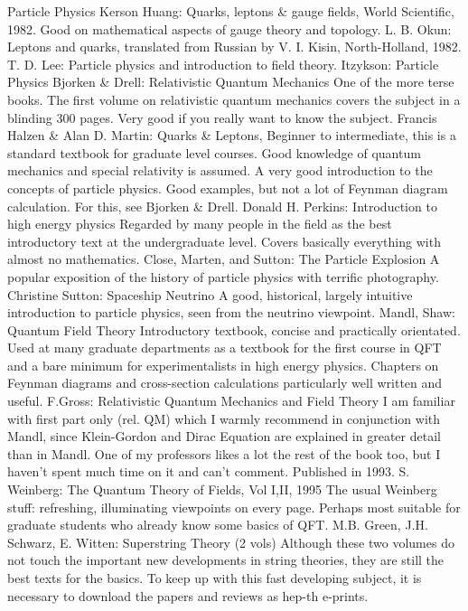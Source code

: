 \documentclass[10pt,a4paper]{book}
\theoremstyle{definition}
\begin{document}
Particle Physics
Kerson Huang: Quarks, leptons \& gauge fields, World Scientific, 1982.
Good on mathematical aspects of gauge theory and topology.
L. B. Okun: Leptons and quarks, translated from Russian by V. I. Kisin, North-Holland, 1982.
T. D. Lee: Particle physics and introduction to field theory.
Itzykson: Particle Physics
Bjorken \& Drell: Relativistic Quantum Mechanics
One of the more terse books.  The first volume on relativistic quantum mechanics covers the subject in a blinding 300 pages.  Very good if you really want to know the subject.
Francis Halzen \& Alan D. Martin: Quarks \& Leptons,
Beginner to intermediate, this is a standard textbook for graduate level courses.  Good knowledge of quantum mechanics and special relativity is assumed.  A very good introduction to the concepts of particle physics.  Good examples, but not a lot of Feynman diagram calculation.  For this, see Bjorken \& Drell.
Donald H. Perkins: Introduction to high energy physics
Regarded by many people in the field as the best introductory text at the undergraduate level.  Covers basically everything with almost no mathematics.
Close, Marten, and Sutton: The Particle Explosion
A popular exposition of the history of particle physics with terrific photography.
Christine Sutton: Spaceship Neutrino
A good, historical, largely intuitive introduction to particle physics, seen from the neutrino viewpoint.
Mandl, Shaw: Quantum Field Theory
Introductory textbook, concise and practically orientated.  Used at many graduate departments as a textbook for the first course in QFT and a bare minimum for experimentalists in high energy physics.  Chapters on Feynman diagrams and cross-section calculations particularly well written and useful.
F.Gross: Relativistic Quantum Mechanics and Field Theory
I am familiar with first part only (rel. QM) which I warmly recommend in conjunction with Mandl, since Klein-Gordon and Dirac Equation are explained in greater detail than in Mandl.  One of my professors likes a lot the rest of the book too, but I haven't spent much time on it and can't comment.  Published in 1993.
S. Weinberg: The Quantum Theory of Fields, Vol I,II, 1995
The usual Weinberg stuff: refreshing, illuminating viewpoints on every page.  Perhaps most suitable for graduate students who already know some basics of QFT. 
M.B. Green, J.H. Schwarz, E. Witten: Superstring Theory (2 vols)
Although these two volumes do not touch the important new developments in string theories, they are still the best texts for the basics.  To keep up with this fast developing subject, it is necessary to download the papers and reviews as hep-th e-prints.
\end{document}
